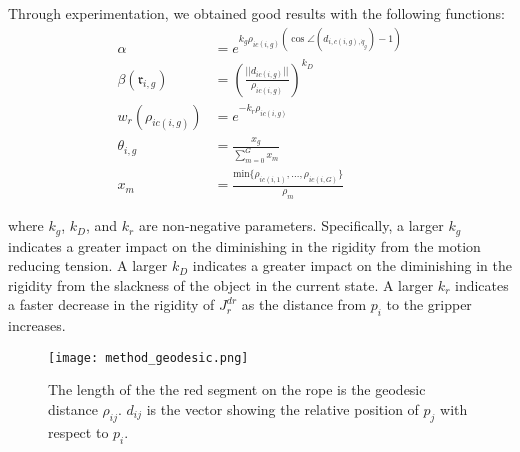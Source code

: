 Through experimentation, we obtained good results with the following functions:
\begin{equation}
\begin{split}
\alpha & = e^{k_g \rho_{ic(i,g)}(\cos \angle(d_{i,c(i,g), \dot{q}_g}) -1)}  \\
\beta (\mathfrak{r}_{i,g}) & = \left( \frac{||d_{ic(i,g)}||}{\rho_{ic(i,g)}} \right) ^{k_D} \\
w_{r}(\rho_{ic(i,g)}) & = e^{-k_{r}\rho_{ic(i,g)}} \\
\theta_{i,g} & = \frac{x_g}{\sum_{m = 0}^G x_m}\\
x_m & = \frac{\textrm{min} \{\rho_{ic(i,1)}, ... , \rho_{ic(i,G)}\}}{\rho_m} 
\end{split}
\label{Eq: functions_in_this_paper}
\end{equation}



\noindent where $k_g$, $k_D$, and $k_{r}$ are non-negative parameters. Specifically, a larger $k_g$ indicates a greater impact on the diminishing in the rigidity from the motion reducing tension. A larger $k_D$ indicates a greater impact on the diminishing in the rigidity from the slackness of the object in the current state. 
A larger $k_{r}$ indicates a faster decrease in the rigidity of $J^{dr}_{r}$ as the distance from $p_i$ to the gripper increases. 


\begin{figure}[t]
  \centering
  \texttt{[image: method\_geodesic.png]}
  \caption{The length of the the red segment on the rope is the geodesic distance $\rho_{ij}$. $d_{ij}$ is the vector showing the relative position of $p_j$ with respect to $p_i$.}
  \label{Fig: method_direction_rigidity}
\end{figure}

